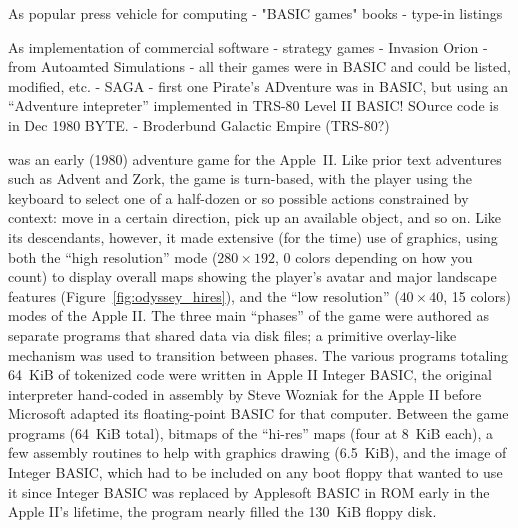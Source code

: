 \documentclass{article}
\begin{document}
As popular press vehicle for computing
  - "BASIC games" books
  - type-in listings

As implementation of commercial software - strategy games
  - Invasion Orion - from Autoamted Simulations - all their games were
  in BASIC and could be listed, modified, etc.
  - SAGA - first one Pirate's ADventure was in BASIC, but using an
  ``Adventure intepreter'' implemented in TRS-80 Level II BASIC!  SOurce
  code is in Dec 1980 BYTE.
  - Broderbund Galactic Empire (TRS-80?)







 was an early (1980) adventure game
for the Apple~II.
Like prior text adventures such as Advent and Zork, the game is
turn-based, with the player using the 
keyboard to select one of a half-dozen or so possible actions
constrained by context: move in a certain direction, pick up an
available object, and so on.
Like its descendants, however, it made extensive (for the time) use of
graphics, using both the ``high resolution'' mode ($280\times 192$, 0 colors
depending on how you count) to display overall maps showing the player's
avatar and major landscape features (Figure~\ref{fig:odyssey_hires}), and the
``low resolution'' ($40\times 40$, 15
colors) modes of the Apple II.
The three main ``phases'' of the game were authored as separate programs
that shared data via disk files; a primitive overlay-like mechanism was
used to transition between phases.  
The various programs totaling 64~KiB of tokenized code were written in Apple II Integer
BASIC, the
original interpreter hand-coded in assembly by Steve Wozniak for
the Apple II before Microsoft adapted its floating-point BASIC for that
computer.  Between the game programs (64~KiB total), bitmaps of the ``hi-res''
maps (four at 8~KiB each), a few assembly routines to help with graphics
drawing (6.5~KiB), and the image of Integer BASIC, which had to be
included on any boot floppy that wanted to use it since Integer BASIC
was replaced by Applesoft BASIC in ROM early in the Apple II's lifetime,
the program nearly filled the 130~KiB floppy disk.
\end{document}
